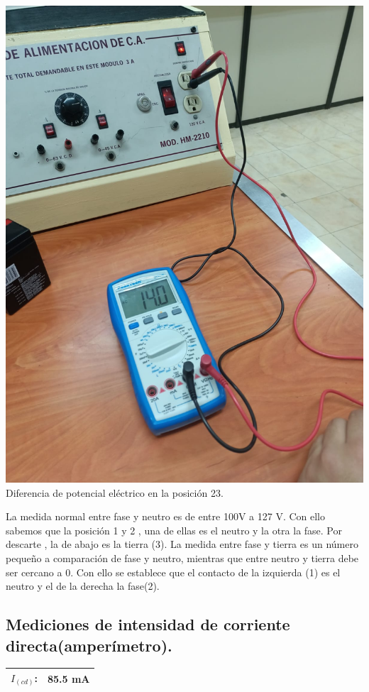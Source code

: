\documentclass[10pt]{article}
\begin{document}
\begin{multicols}{2}
\begin{center}
	\includegraphics[scale = 0.1]{Imagenes/Fotos/23.jpeg}\\
	Diferencia de potencial eléctrico en la posición 23.
\end{center}
 
La medida normal entre fase y neutro es de entre 100V a 127 V. Con ello sabemos que la posición 1 y 2 , una de ellas es el neutro y la otra la fase. Por descarte , la de abajo es la tierra (3).
La medida entre fase y tierra es un número pequeño a comparación de fase y neutro, mientras que entre neutro y tierra debe ser cercano a 0. Con ello se establece que el contacto de la izquierda (1) es el neutro y el de la derecha la fase(2).

\subsection{Mediciones de intensidad de corriente directa(amperímetro).}

\begin{tabular}{ p{4cm} p{3cm} }
	\hline
	$I_(cd)$: & 85.5 mA \\
	\hline
\end{tabular}


\end{multicols}
\end{document}
